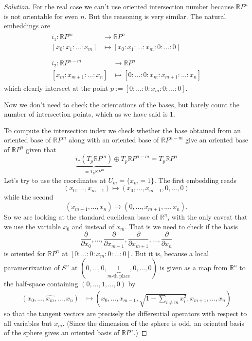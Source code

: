 \begin{proof}[Solution]
For the real case we can't use oriented intersection number because \(\mathbb{R}P^{n}\) is not orientable for even \(n\). But the reasoning is very similar. The natural embeddings are
\begin{align*}
\begin{aligned}i_1: \mathbb{R}P^m &\longrightarrow \mathbb{R}P^n \\
	[x_0:x_1:\ldots:x_m] &\longmapsto [x_0:x_1:\ldots:x_m:0:\ldots:0]
\end{aligned}
\\\\\begin{aligned}	i_2: \mathbb{R}P^{n-m} &\longrightarrow \mathbb{R}P^n \\
[x_{m}:x_{m+1}:\ldots:x_n] &\longmapsto [0:\ldots:0:x_{m}:x_{m+1}:\ldots:x_n] \end{aligned}\end{align*}
which clearly intersect at the point \(p:=[0:\ldots:0:x_m:0:\ldots:0]\).

Now we don't need to check the orientations of the bases, but barely count the number of intersection points, which as we have said is 1.

\iffalse
To compute the intersection index we check whether the base obtained from an oriented base of \(\mathbb{R}P^{m}\) along with an oriented base of \(\mathbb{R}P^{n-m}\) give an oriented base of \(\mathbb{R}P^{n}\) given that
\[\underbrace{i_*(T_p \mathbb{R}P^{m})}_{=T_p\mathbb{R}P^m}\oplus T_p\mathbb{R}P^{n-m}=T_p\mathbb{R}P^{n}\]
Let's try to use the coordinates at \(U_m=\{x_m=1\}\). The first embedding reads
\[(x_0,\ldots,x_{m-1})\mapsto (x_0,\ldots,x_{m-1},0,\ldots,0)\]
while the second
\[(x_{m+1},\ldots,x_n)\mapsto (0,\ldots,x_{m+1},\ldots,x_n).\]
So we are looking at the standard euclidean base of \(\mathbb{R}^n\), with the only caveat that we use the variable \(x_0\) and instead of \(x_m\). That is we need to check if the basis
\[\frac{\partial }{\partial x_0},\ldots,\frac{\partial }{\partial x_{m-1}},\frac{\partial }{\partial x_{m+1}},\ldots,\frac{\partial }{\partial x_n}\]
is oriented for \(\mathbb{R}P^{n}\) at \([0:\ldots:0:x_m:0:\ldots:0]\). But it is, because a local parametrixation of \(S^{n}\) at \((0,\ldots,0,\underbrace{1}_{m\text{-th place} },0,\ldots,0)\) is given as a map from \(\mathbb{R}^n\) to the half-space containing \((0,\ldots,1,\ldots,0)\) by
\begin{align*}
	(x_0,\ldots,\widehat{x_m},\ldots,x_n) &\longmapsto \left(x_0,\ldots,x_{m-1},\sqrt{1-\sum_{i\neq m}x_i^2} ,x_{m+1},\ldots,x_n\right) 
\end{align*}
so that the tangent vectors are precisely the differential operators with respect to all variables but \(x_m\). (Since the dimension of the sphere is odd, an oriented basis of the sphere gives an oriented basis of  \(\mathbb{R}P^{n}\).)




\end{proof}
